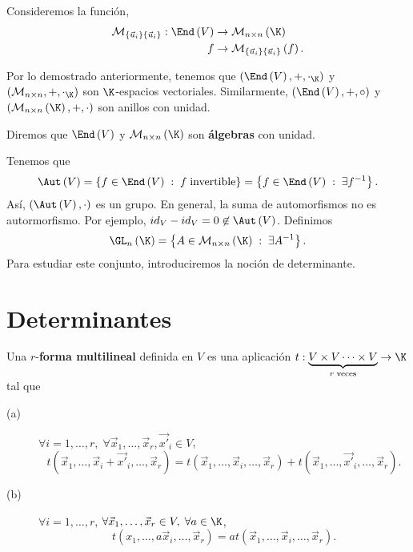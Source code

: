 Consideremos la función, 
\[
\begin{split}
	\mathcal{M}_{ \left\{ \vec{u}_{i}\right\} \left\{ \vec{u}_{i}\right\} } : \End\left(V\right) & \to \mathcal{M}_{n \times n}\left(\K\right) \\
	f & \to \mathcal{M}_{ \left\{ \vec{u}_{i}\right\} \left\{ \vec{u}_{i}\right\} }\left(f\right).
\end{split}
\]
\begin{fprop}[]
\normalfont Por lo demostrado anteriormente, tenemos que $\displaystyle \left(\End\left(V\right), +, \cdot _{\K}\right) $ y $\displaystyle \left( \mathcal{M}_{n \times n}, + , \cdot _{\K}\right) $ son $\displaystyle \K $-espacios vectoriales. Similarmente, $\displaystyle \left(\End\left(V\right), + ,\circ\right) $ y $\displaystyle \left(\mathcal{M}_{n \times n }\left(\K\right), +, \cdot\right) $  son anillos con unidad. 
\end{fprop}

\begin{fdefinition}[]
\normalfont Diremos que $\displaystyle \End\left(V\right) $ y $\displaystyle \mathcal{M}_{n \times n}\left(\K\right) $ son \textbf{álgebras} con unidad.
\end{fdefinition}

Tenemos que 
\[\Aut\left(V\right) = \left\{ f \in \End\left(V\right) \; : \; f \; \text{invertible}\right\} = \left\{ f \in \End\left(V\right) \; : \; \exists f^{-1}\right\}  .\]
Así, $\displaystyle \left(\Aut\left(V\right), \cdot\right) $ es un grupo. En general, la suma de automorfismos no es autormorfismo. Por ejemplo, $\displaystyle id _{V} - id _{V} = 0 \not\in\Aut\left(V\right) $. Definimos 
\[\GL_{n}\left(\K\right) = \left\{ A \in \mathcal{M}_{n \times n}\left(\K\right) \; : \; \exists A^{-1}\right\}  .\]
Para estudiar este conjunto, introduciremos la noción de determinante.

\section{Determinantes}
\begin{fdefinition}[]
	\normalfont Una $\displaystyle r $-\textbf{forma multilineal}  definida en $\displaystyle V $ es una aplicación $\displaystyle t : \underbrace{ V \times V \cdots \times V}_{r \; \text{veces}} \to \K $ tal que 
\begin{description}
\item[(a)] $\displaystyle \forall i = 1, \ldots, r, \; \forall \vec{x}_{1}, \ldots, \vec{x}_{r}, \vec{x'}_{i} \in V $,
\[t\left(\vec{x}_{1}, \ldots, \vec{x}_{i} + \vec{x'}_{i}, \ldots, \vec{x}_{r}\right) = t\left(\vec{x}_{1}, \ldots, \vec{x}_{i}, \ldots, \vec{x}_{r}\right) + t\left(\vec{x}_{1}, \ldots, \vec{x'}_{i}, \ldots, \vec{x}_{r}\right).\]
\item[(b)] $\displaystyle \forall i = 1, \ldots, r $, $\displaystyle \forall \vec{x}_{1}, \ldots, \vec{x}_{r} \in V, \; \forall a \in \K $,
	\[t\left(x_{1}, \ldots, a\vec{x}_{i}, \ldots, \vec{x}_{r}\right) = a t\left(\vec{x}_{1}, \ldots, \vec{x}_{i}, \ldots, \vec{x}_{r}\right) .\]
\end{description}
\end{fdefinition}

